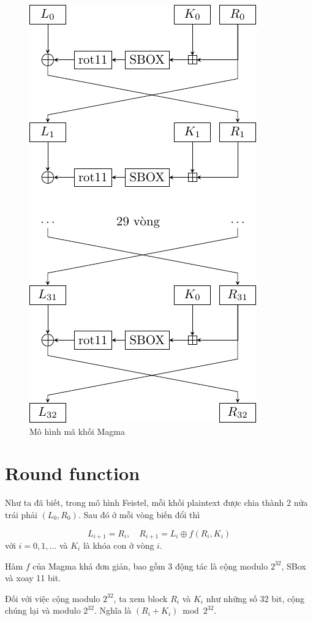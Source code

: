 \begin{figure}[ht]
    \centering
    \includegraphics{Magma/blocky.pdf}
    \caption{Mô hình mã khối Magma}
\end{figure}

\section{Round function}

Như ta đã biết, trong mô hình Feistel, mỗi khối plaintext
được chia thành 2 nửa trái phải $(L_0, R_0)$. Sau đó ở mỗi vòng
biến đổi thì

\[L_{i+1} = R_i, \quad R_{i+1} = L_i \oplus f(R_i, K_i)\]
với $i=0, 1, \ldots$ và $K_i$ là khóa con ở vòng $i$.

Hàm $f$ của Magma khá đơn giản, bao gồm 3 động tác là cộng modulo 
$2^{32}$, SBox và xoay 11 bit.

Đối với việc cộng modulo $2^{32}$, ta xem block $R_i$ và $K_i$ như
những số 32 bit, cộng chúng lại và modulo $2^{32}$. Nghĩa là 
$(R_i + K_i) \bmod 2^{32}$.

